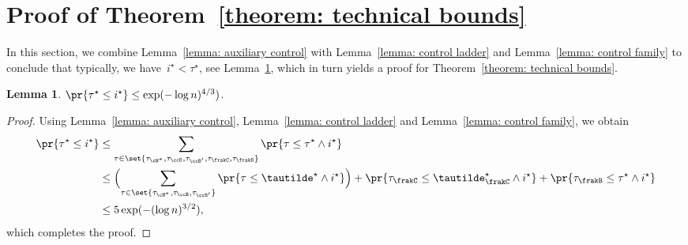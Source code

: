 \documentclass[11pt]{amsart}
\DeclarePairedDelimiter{\paren}{\lparen}{\rparen}
\newtheorem{lemma}[algocf]{Lemma}
\theoremstyle{definition}
\numberwithin{equation}{section}
\begin{document}
\section{Proof of Theorem~\ref{theorem: technical bounds}}\label{section: proof}
	In this section, we combine Lemma~\ref{lemma: auxiliary control} with Lemma~\ref{lemma: control ladder} and Lemma~\ref{lemma: control family} to conclude that typically, we have~$i^\star<\tau^\star$, see Lemma~\ref{lemma: control everything}, which in turn yields a proof for Theorem~\ref{theorem: technical bounds}.
	
	\begin{lemma}\label{lemma: control everything}
		$\pr{\tau^\star\leq i^\star}\leq \exp(-\log n)^{4/3})$.
	\end{lemma}
	
	\begin{proof}
		Using Lemma~\ref{lemma: auxiliary control}, Lemma~\ref{lemma: control ladder} and Lemma~\ref{lemma: control family}, we obtain
		\begin{equation*}
			\begin{aligned}
				\pr{\tau^\star\leq i^\star}
				&\leq \sum_{\tau\in \set{\tau_{\cH^*}, \tau_\ccB,\tau_{\ccB'},\tau_\frakC,\tau_\frakB}} \pr{\tau\leq \tau^\star\wedge i^\star}\\
				&\leq \paren[\Big]{\sum_{\tau\in\set{ \tau_{\cH^*}, \tau_\ccB,\tau_{\ccB'} }}\pr{ \tau\leq \tautilde^\star\wedge i^\star }}
				+\pr{ \tau_{\frakC}\leq \tautilde_\frakC^\star\wedge i^\star }
				+\pr{ \tau_{\frakB}\leq \tau^\star\wedge i^\star }\\
				&\leq 5\exp(-(\log n)^{3/2}),
			\end{aligned}
		\end{equation*}
		which completes the proof.
	\end{proof}
\end{document}
